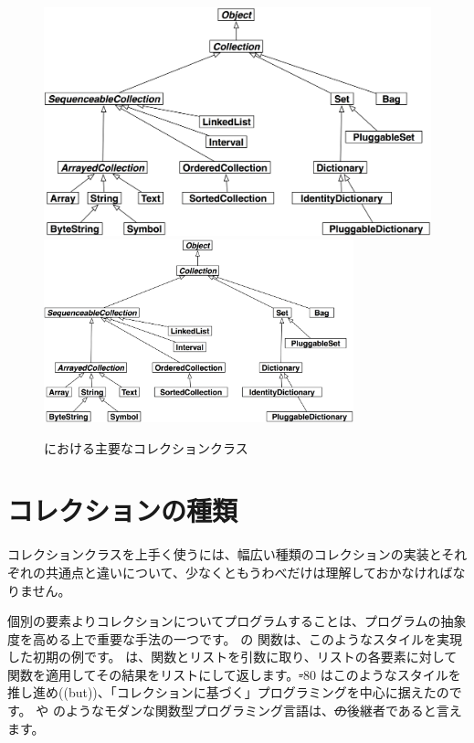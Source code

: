 \documentclass[a4paper,10pt,twoside]{book}
\begin{document}
\begin{figure}
\begin{center}
\ifluluelse
	{\includegraphics[width=\textwidth]{CollectionHierarchy}}
	{\includegraphics[width=0.8\textwidth]{CollectionHierarchy}}
\caption{\pharo における主要なコレクションクラス}
\end{center}
\end{figure}

\section{コレクションの種類}

コレクションクラスを上手く使うには、幅広い種類のコレクションの実装とそれぞれの共通点と違いについて、少なくともうわべだけは理解しておかなければなりません。

個別の要素よりコレクションについてプログラムすることは、プログラムの抽象度を高める上で重要な手法の一つです。
 の  関数は、このようなスタイルを実現した初期の例です。 は、関数とリストを引数に取り、リストの各要素に対して関数を適用してその結果をリストにして返します。\st-80 はこのようなスタイルを推し進め((but))、「コレクションに基づく」プログラミングを中心に据えたのです。 や  のようなモダンな関数型プログラミング言語は、\st の後継者であると言えます。
\end{document}
